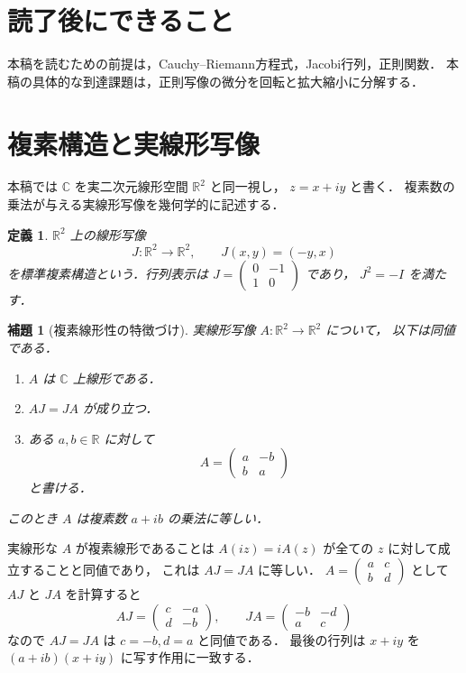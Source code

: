 \documentclass[a5paper,10pt,onecolumn]{jsarticle}
\makeatletter
\theoremstyle{mathnotetheorem}
\newtheorem{definition}[theorem]{定義}
\newtheorem{lemma}[theorem]{補題}
\renewcommand{\proofname}{証明}
\renewenvironment{proof}[1][\proofname]{%
  \par\pushQED{\qed}\normalfont\topsep4\p@\@plus2\p@\relax
  \trivlist\item[\hskip\labelsep\bfseries #1]\ignorespaces
}{\popQED\endtrivlist\@endpefalse}
\makeatother
\begin{document}
\section*{読了後にできること}
本稿を読むための前提は，Cauchy--Riemann方程式，Jacobi行列，正則関数．
本稿の具体的な到達課題は，正則写像の微分を回転と拡大縮小に分解する．

\section{複素構造と実線形写像}

本稿では $\mathbb C$ を実二次元線形空間 $\mathbb R^2$ と同一視し，
$z=x+iy$ と書く．
複素数の乗法が与える実線形写像を幾何学的に記述する．

\begin{definition}
$\mathbb R^2$ 上の線形写像
\[
 J:\mathbb R^2\to\mathbb R^2,\qquad J(x,y)=(-y,x)
\]
を標準複素構造という．行列表示は
$J=\begin{pmatrix}0&-1\\1&0\end{pmatrix}$ であり，
$J^2=-I$ を満たす．
\end{definition}

\begin{lemma}[複素線形性の特徴づけ]\label{lem:complex-linear}
実線形写像 $A:\mathbb R^2\to\mathbb R^2$ について，
以下は同値である．
\begin{enumerate}
\item $A$ は $\mathbb C$ 上線形である．
\item $AJ=JA$ が成り立つ．
\item ある $a,b\in\mathbb R$ に対して
\[
 A=\begin{pmatrix}a&-b\\ b&a\end{pmatrix}
\]
と書ける．
\end{enumerate}
このとき $A$ は複素数 $a+ib$ の乗法に等しい．
\end{lemma}
\begin{proof}
実線形な $A$ が複素線形であることは
$A(iz)=iA(z)$ が全ての $z$ に対して成立することと同値であり，
これは $AJ=JA$ に等しい．
$A=\begin{pmatrix}a&c\\b&d\end{pmatrix}$ として
$AJ$ と $JA$ を計算すると
\[
 AJ=\begin{pmatrix}c&-a\\d&-b\end{pmatrix},\qquad
 JA=\begin{pmatrix}-b&-d\\a&c\end{pmatrix}
\]
なので $AJ=JA$ は $c=-b,d=a$ と同値である．
最後の行列は $x+iy$ を
$(a+ib)(x+iy)$ に写す作用に一致する．
\end{proof}
\end{document}
